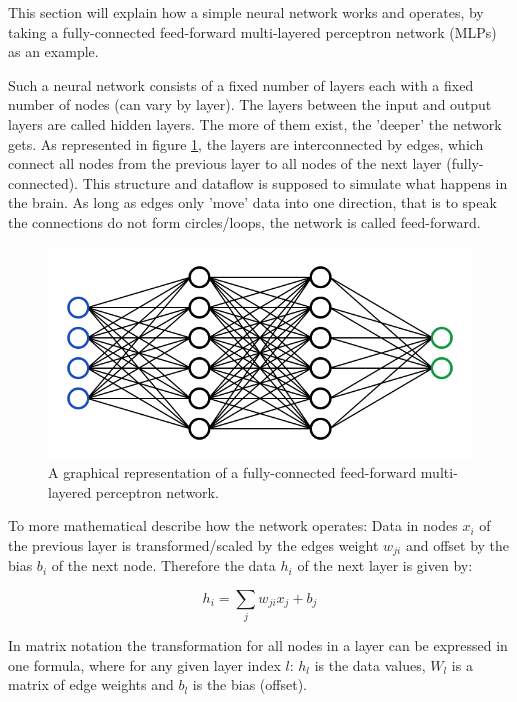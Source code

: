 \documentclass[a4paper,10pt]{scrartcl}
\begin{document}
This section will explain how a simple neural network works and operates, by taking a fully-connected feed-forward multi-layered perceptron network (MLPs) as an example.

Such a neural network consists of a fixed number of layers each with a fixed number of nodes (can vary by layer).
The layers between the input and output layers are called hidden layers.
The more of them exist, the 'deeper' the network gets.
As represented in figure \ref{fig:neuralnetwork}, the layers are interconnected by edges, which connect all nodes from the previous layer to all nodes of the next layer (fully-connected).
This structure and dataflow is supposed to simulate what happens in the brain.
As long as edges only 'move' data into one direction, that is to speak the connections do not form circles/loops, the network is called feed-forward.

\begin{figure}[h]
    \includegraphics[scale=0.5]{images/neuralnetwork.png}
    \centering
    \caption{A graphical representation of a fully-connected feed-forward multi-layered perceptron network.}
    \label{fig:neuralnetwork}
\end{figure}

To more mathematical describe how the network operates: Data in nodes $x_i$ of the previous layer is transformed/scaled by the edges weight $w_{ji}$ and offset by the bias $b_i$ of the next node.
Therefore the data $h_i$ of the next layer is given by:

\begin{equation}
    h_i = \sum_j{w_{ji}x_j} + b_j
\end{equation}

In matrix notation the transformation for all nodes in a layer can be expressed in one formula, where for any given layer index $l$: $h_l$ is the data values, $W_l$ is a matrix of edge weights and $b_l$ is the bias (offset).
\end{document}
